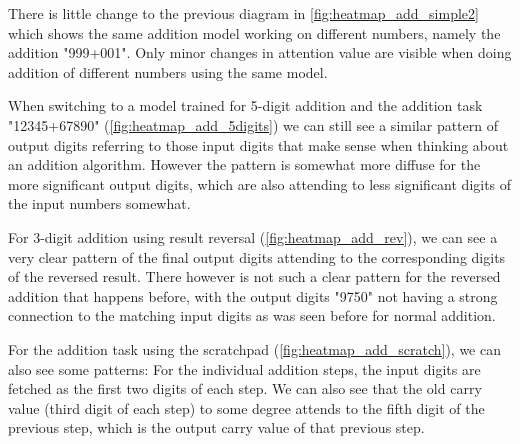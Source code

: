 
There is little change to the previous diagram in \cref{fig:heatmap_add_simple2} which shows the same addition model working on different numbers, namely the addition "999+001". Only minor changes in attention value are visible when doing addition of different numbers using the same model.


When switching to a model trained for 5-digit addition and the addition task "12345+67890" (\cref{fig:heatmap_add_5digits}) we can still see a similar pattern of output digits referring to those input digits that make sense when thinking about an addition algorithm. However the pattern is somewhat more diffuse for the more significant output digits, which are also attending to less significant digits of the input numbers somewhat.


For 3-digit addition using result reversal (\cref{fig:heatmap_add_rev}), we can see a very clear pattern of the final output digits attending to the corresponding digits of the reversed result. There however is not such a clear pattern for the reversed addition that happens before, with the output digits "9750" not having a strong connection to the matching input digits as was seen before for normal addition.


For the addition task using the scratchpad (\cref{fig:heatmap_add_scratch}), we can also see some patterns: For the individual addition steps, the input digits are fetched as the first two digits of each step. We can also see that the old carry value (third digit of each step) to some degree attends to the fifth digit of the previous step, which is the output carry value of that previous step.

